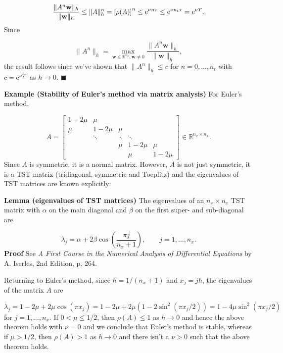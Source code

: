 \documentclass[12pt,a4paper]{article}
\begin{document}
\[
\frac{\| A^n \mathbf{w} \|_h}{\|  \mathbf{w}\|_h} \leq \|A\|_h^{n} = \left[\rho(A)\right]^n \leq {\rm e}^{\nu n\tau}\leq  {\rm e}^{\nu n_t\tau} = {\rm e}^{\nu T}.
\]
Since 

\[
\|A^n \|_h = \max_{\mathbf{w}\in \mathbb{R}^{n_x}, \mathbf{w}\neq 0}\frac{\| A^n \mathbf{w} \|_h}{\|  \mathbf{w}\|_h},
\]
the result follows since we've shown that $\|A^n \|_h \leq c$ for $n = 0, \ldots, n_t$ with $c = {\rm e}^{\nu T}$ as $h \to 0$.  $\blacksquare$

\textbf{Example (Stability of Euler's method via matrix analysis)} For Euler's method, 

\[
 A = \begin{bmatrix}
1 - 2\mu & \mu & & & \\
\mu  & 1-2\mu & \mu  & & \\
      & \ddots & \ddots & \ddots & \\
      &        & \mu    & 1- 2\mu & \mu \\
      &        &        &\mu      & 1-2\mu
\end{bmatrix} \in \mathbb{R}^{n_x \times n_x}.
\]
Since $A$ is symmetric, it is a normal matrix.  However, $A$ is not just symmetric, it is a TST matrix (tridiagonal, symmetric and Toeplitz) and the eigenvalues of TST matrices are known explicitly: 

\textbf{Lemma (eigenvalues of TST matrices)} The eigenvalues of an $n_x \times n_x$ TST matrix with $\alpha$ on the main diagonal and $\beta$ on the first super- and sub-diagonal are

\[
\lambda_j = \alpha + 2\beta\cos\left( \frac{\pi j}{n_x+1}  \right), \qquad j = 1, \ldots, n_x.
\]
\textbf{Proof} See \emph{A First Course in the Numerical Analysis of Differential Equations} by A. Iserles, 2nd Edition, p. 264.

Returning to Euler's method, since $h = 1/(n_x+1)$ and $x_j = jh$, the eigenvalues of the matrix $A$ are

\[
\lambda_j = 1-2\mu + 2\mu\cos(\pi x_j) = 1-2\mu +2\mu(1 - 2\sin^2(\pi x_j/2)) = 1 - 4\mu\sin^2(\pi x_j/2) 
\]
for $j = 1, \ldots, n_x$.  If $0 < \mu \leq 1/2$, then $\rho(A) \leq 1$ as $h \to 0$ and hence the above theorem holds with $\nu = 0$ and we conclude that Euler's method is stable, whereas if $\mu > 1/2$, then $\rho(A) > 1$ as $h \to 0$ and there isn't a $\nu > 0$ such that the above theorem holds.
\end{document}
